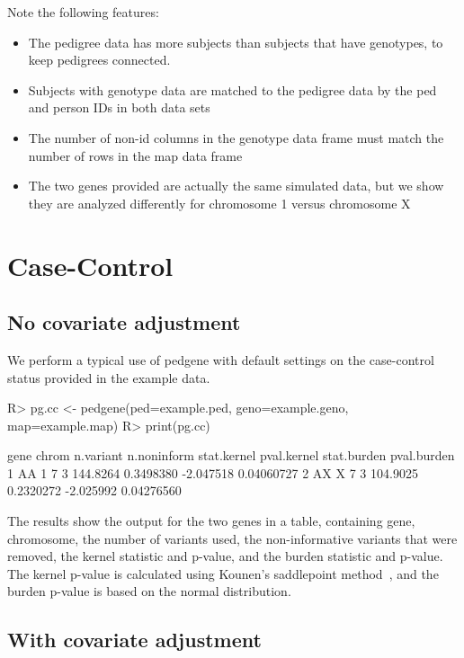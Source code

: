 \documentclass[letterpaper]{article}
\begin{document}
Note the following features:
\begin{itemize}
\item The pedigree data has more subjects than subjects that have genotypes, to keep
  pedigrees connected.
\item Subjects with genotype data are matched to the pedigree data by the ped 
  and person IDs in both data sets
\item The number of non-id columns in the genotype data frame must match the number 
  of rows in the map data frame
\item The two genes provided are actually the same simulated data, but we show they are 
  analyzed differently for chromosome 1 versus chromosome X
\end{itemize}

\section{Case-Control}

\subsection*{No covariate adjustment}

We perform a typical use of pedgene with default settings on the case-control
status provided in the example data.

\begin{Schunk}
\begin{Sinput}
R> pg.cc <- pedgene(ped=example.ped, geno=example.geno, map=example.map)
R> print(pg.cc)
\end{Sinput}
\begin{Soutput}
  gene chrom n.variant n.noninform stat.kernel pval.kernel stat.burden pval.burden
1   AA     1         7           3    144.8264   0.3498380   -2.047518  0.04060727
2   AX     X         7           3    104.9025   0.2320272   -2.025992  0.04276560
\end{Soutput}
\end{Schunk}


\noindent The results show the output for the two genes in a table, 
containing gene, chromosome, the number of variants used, the non-informative variants 
that were removed, the kernel statistic and p-value, and the burden 
statistic and p-value.  The kernel p-value is calculated using Kounen's saddlepoint 
method~\cite{Kounen}, and the burden p-value is based on the normal distribution.

\subsection*{With covariate adjustment}
\end{document}
